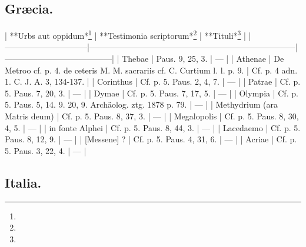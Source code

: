 \documentclass[a4paper, 11pt, oneside, polutonikogreek, german]{article}
\begin{document}
\subsection{Græcia.}

| **Urbs aut oppidum*\footnote{}         | **Testimonia scriptorum*\footnote{}                                                 | **Tituli*\footnote{}                            |
|------------------------------|---------------------------------------------------------------------------|---------------------------------------|
| Thebae                       | Paus. 9, 25, 3.                                                           | ---                                   |
| Athenae                      | De Metroo cf. p. 4. de ceteris M. M. sacrariis cf. C. Curtium l. l. p. 9. | Cf. p. 4 adn. 1. C. J. A. 3, 134-137. |
| Corinthus                    | Cf. p. 5. Paus. 2, 4, 7.                                                  | ---                                   |
| Patrae                       | Cf. p. 5. Paus. 7, 20, 3.                                                 | ---                                   |
| Dymae                        | Cf. p. 5. Paus. 7, 17, 5.                                                 | ---                                   |
| Olympia                      | Cf. p. 5. Paus. 5, 14. 9. 20, 9. Archäolog. ztg. 1878 p. 79.              | ---                                   |
| Methydrium (ara Matris deum) | Cf. p. 5. Paus. 8, 37, 3.                                                 | ---                                   |
| Megalopolis                  | Cf. p. 5. Paus. 8, 30, 4, 5.                                              | ---                                   |
| in fonte Alphei              | Cf. p. 5. Paus. 8, 44, 3.                                                 | ---                                   |
| Lacedaemo                    | Cf. p. 5. Paus. 8, 12, 9.                                                 | ---                                   |
| [Messene] ?                  | Cf. p. 5. Paus. 4, 31, 6.                                                 | ---                                   |
| Acriae                       | Cf. p. 5. Paus. 3, 22, 4.                                                 | ---                                   |

\subsection{Italia.}
\end{document}
